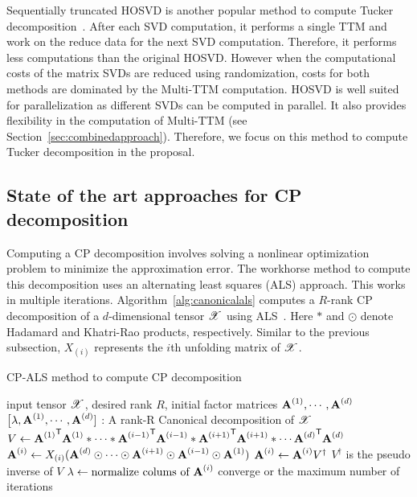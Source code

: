 \documentclass[a4paper,11pt]{article}
\newcommand{\X}{\T{X}}
\begin{document}
	
	
	
	Sequentially truncated HOSVD is another popular method to compute Tucker decomposition~\cite{VVM-SIAM-2012}. After each SVD computation, it performs a single TTM and work on the reduce data for the next SVD computation. Therefore, it performs less computations than the original HOSVD. However when the computational costs of the matrix SVDs are reduced using randomization, costs for both methods are dominated by the Multi-TTM computation. HOSVD is well suited for parallelization as different SVDs can be computed in parallel. It also provides flexibility in the computation of Multi-TTM (see Section~\ref{sec:combinedapproach}). Therefore, we focus on this method to compute Tucker decomposition in the proposal.		
	
	\subsection{State of the art approaches for CP decomposition}
	\label{sec:context:soa:Canonical}
	Computing a CP decomposition involves solving a nonlinear optimization problem to minimize the approximation error. The workhorse method to compute this decomposition uses an alternating least squares (ALS) approach. This works in multiple iterations. Algorithm~\ref{alg:canonicalals} computes a $R$-rank CP decomposition of a $d$-dimensional tensor $\X$ using ALS~\cite{KB-SIAM-2009}. Here $*$ and $\odot$ denote Hadamard and Khatri-Rao products, respectively. Similar to the previous subsection, $X_{(i)}$ represents the $i$th unfolding matrix of $\X$. 
	
	\begin{algorithm}[t]{
			\caption{CP-ALS method to compute CP decomposition\label{alg:canonicalals}}
			\begin{algorithmic}[1]
				\Require input tensor $\X$, desired rank $R$, initial factor matrices $\Mn{A}{1}, \cdots, \Mn{A}{d}$
				\Ensure $\big[\lambda, \Mn{A}{1}, \cdots, \Mn{A}{d}]$ : A rank-R Canonical decomposition of $\X$
				\Repeat
				\label{method:canonical:oneiter:start}
				\State $V\gets{\Mn{A}{1}}^\Tra{\Mn{A}{1}}*\cdots*{\Mn{A}{i-1}}^\Tra{\Mn{A}{i-1}}*{\Mn{A}{i+1}}^\Tra{\Mn{A}{i+1}}*\cdots{\Mn{A}{d}}^\Tra{\Mn{A}{d}}$
				\State ${\Mn{A}{i}}\gets X_{(i)} ({\Mn{A}{d}}\odot\cdots\odot{\Mn{A}{i+1}}\odot{\Mn{A}{i-1}}\odot {\Mn{A}{1}})$\label{alg:canonicalals:mttkrp}
				\State ${\Mn{A}{i}}\gets {\Mn{A}{i}}V^\dagger$ \Comment $V^\dagger$ is the pseudo inverse of $V$
				\State $\lambda\gets \text{normalize colums of }{\Mn{A}{i}}$ 
				\EndFor\label{method:canonical:oneiter:end}
				\Until converge or the maximum number of iterations
			\end{algorithmic}
	}\end{algorithm}\vspace*{-0.15cm}
	
\end{document}
